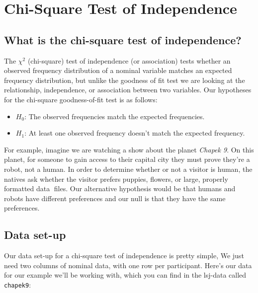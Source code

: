 \documentclass[
]{book}
\begin{document}
\hypertarget{chi-square-test-of-independence}{%
\chapter{Chi-Square Test of Independence}\label{chi-square-test-of-independence}}

\hypertarget{what-is-the-chi-square-test-of-independence}{%
\section{What is the chi-square test of independence?}\label{what-is-the-chi-square-test-of-independence}}

The \(\chi^2\) (chi-square) test of independence (or association) tests whether an observed frequency distribution of a nominal variable matches an expected frequency distribution, but unlike the goodness of fit test we are looking at the relationship, independence, or association between two variables. Our hypotheses for the chi-square goodness-of-fit test is as follows:

\begin{itemize}
\item
  \(H_0\): The observed frequencies match the expected frequencies.
\item
  \(H_1\): At least one observed frequency doesn't match the expected frequency.
\end{itemize}

For example, imagine we are watching a show about the planet \emph{Chapek 9}. On this planet, for someone to gain access to their capital city they must prove they're a robot, not a human. In order to determine whether or not a visitor is human, the natives ask whether the visitor prefers puppies, flowers, or large, properly formatted data files. Our alternative hypothesis would be that humans and robots have different preferences and our null is that they have the same preferences.

\hypertarget{data-set-up-3}{%
\section{Data set-up}\label{data-set-up-3}}

Our data set-up for a chi-square test of independence is pretty simple, We just need two columns of nominal data, with one row per participant. Here's our data for our example we'll be working with, which you can find in the lsj-data called \texttt{chapek9}:
\end{document}
